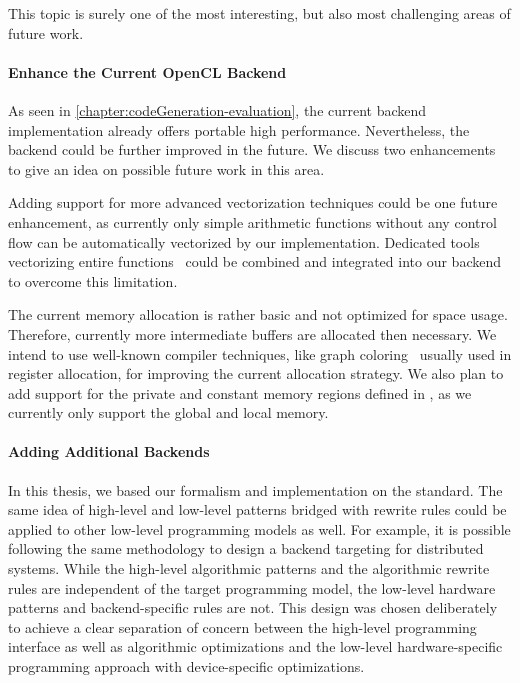 \bigskip
This topic is surely one of the most interesting, but also most challenging areas of future work.

\paragraph{Enhance the Current OpenCL Backend}
As seen in \autoref{chapter:codeGeneration-evaluation}, the current \OpenCL backend implementation already offers portable high performance.
Nevertheless, the backend could be further improved in the future.
We discuss two enhancements to give an idea on possible future work in this area.

Adding support for more advanced vectorization techniques could be one future enhancement, as currently only simple arithmetic functions without any control flow can be automatically vectorized by our implementation.
Dedicated tools vectorizing entire functions~\cite{KarrenbergHa2011} could be combined and integrated into our backend to overcome this limitation.

The current memory allocation is rather basic and not optimized for space usage.
Therefore, currently more intermediate buffers are allocated then necessary.
We intend to use well-known compiler techniques, like graph coloring~\cite{Muchnick1997} usually used in register allocation, for improving the current allocation strategy.
We also plan to add support for the private and constant memory regions defined in \OpenCL, as we currently only support the global and local memory.

\paragraph{Adding Additional Backends}
In this thesis, we based our formalism and implementation on the \OpenCL standard.
The same idea of high-level and low-level patterns bridged with rewrite rules could be applied to other low-level programming models as well.
For example, it is possible following the same methodology to design a backend targeting \MPI for distributed systems.
While the high-level algorithmic patterns and the algorithmic rewrite rules are independent of the target programming model, the low-level hardware patterns and  backend-specific rules are not.
This design was chosen deliberately to achieve a clear separation of concern between the high-level programming interface as well as algorithmic optimizations and the low-level hardware-specific programming approach with device-specific optimizations.

